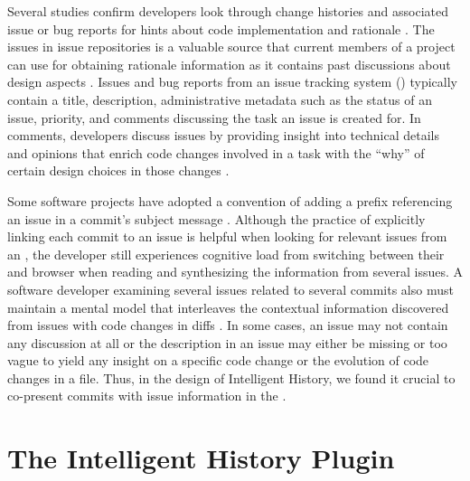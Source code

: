 Several studies confirm developers look through change histories and associated issue or bug reports for hints about code implementation and rationale \cite{ko_information_2007,robillard_turnover-induced_2021, rastkar_why_2013}.
The issues in issue repositories is a valuable source that current members of a project can use for obtaining rationale information as it contains past discussions about design aspects \cite{brunet_design_2014,hassan_road_2008}.
Issues and bug reports from an issue tracking system () typically contain a title, description, administrative metadata such as the status of an issue, priority, and comments discussing the task an issue is created for.
In comments, developers discuss issues by providing insight into technical details and opinions that enrich code changes involved in a task with the ``why'' of certain design choices in those changes \cite{ortu_jira_2015}.

Some software projects have adopted a convention of adding a prefix referencing an issue in a commit's subject message \cite{rastkar_why_2013,moreno_arena_2017}.
Although the practice of explicitly linking each commit to an issue is helpful when looking for relevant issues from an , the developer still experiences cognitive load from switching between their  and browser when reading and synthesizing the information from several issues.
A software developer examining several issues related to several commits also must maintain a mental model that interleaves the contextual information discovered from issues with code changes in diffs .
In some cases, an issue may not contain any discussion at all or the description in an issue may either be missing or too vague to yield any insight on a specific code change or the evolution of code changes in a file.
Thus, in the design of Intelligent History, we found it crucial to co-present commits with issue information in the .

\section{The Intelligent History Plugin}
\label{sec:Implementation}

